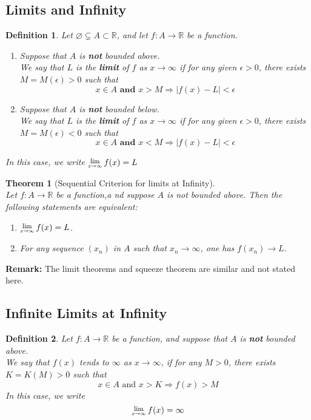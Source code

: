 \documentclass[8pt]{article}
\newcommand{\Lim}[1]{\raisebox{0.5ex}{\scalebox{0.8}{$\displaystyle \lim_{#1}\;$}}}
\newtheorem{definition}{Definition}[section]
\newtheorem{theorem}{Theorem}[section]
\theoremstyle{definition}
\begin{document}
\subsection{Limits and Infinity}
\begin{definition}\normalfont Let $\varnothing\subsetneq A\subset \mathbb{R}$, and let $f:A\to \mathbb{R}$ be a function.
\begin{enumerate}
\item Suppose that $A$ is \textbf{not} bounded above.\\
We say that $L$ is the \textbf{limit} of $f$ as $x\to \infty$ if for any given $\epsilon>0$, there exists $M=M(\epsilon)>0$ such that
\[
x\in A \textbf{ and } x>M\Rightarrow |f(x)-L|<\epsilon
\]
\item Suppose that $A$ is \textbf{not} bounded below.\\
We say that $L$ is the \textbf{limit} of $f$ as $x\to \infty$ if for any given $\epsilon>0$, there exists $M=M(\epsilon)<0$ such that
\[
x\in A \textbf{ and } x<M\Rightarrow |f(x)-L|<\epsilon
\]
\end{enumerate}
In this case, we write $\Lim{x\to \infty}f(x)=L$
\end{definition}
\begin{theorem}[Sequential Criterion for limits at Infinity]
\hfill\\\normalfont Let $f:A\to\mathbb{R}$ be a function,a nd suppose $A$ is not bounded above. Then the following statements are equivalent:
\begin{enumerate}
\item $\Lim{x\to\infty}f(x)=L$.
\item For any sequence $(x_n)$ in $A$ such that $x_n\to\infty$, one has $f(x_n)\to L$.
\end{enumerate}
\end{theorem}
\textbf{Remark:} The limit theorems and squeeze theorem are similar and not stated here.
\subsection{Infinite Limits at Infinity}
\begin{definition}\normalfont Let $f:A\to \mathbb{R}$ be a function, and suppose that $A$ is \textbf{not} bounded above.\\
We say that $f(x)$ tends to $\infty$ as $x\to \infty$, if for any $M>0$, there exists $K=K(M)>0$ such that
\[
x\in A \text{ and }x>K\Rightarrow f(x)>M
\]
In this case, we write
\[
\Lim{x\to\infty}f(x)=\infty
\]
\end{definition}
 
\end{document}
